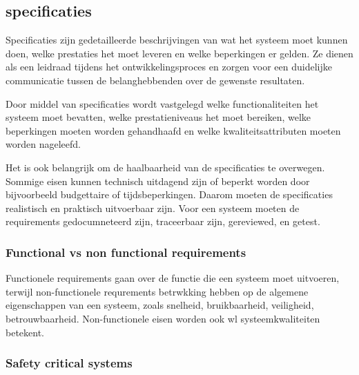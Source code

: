 \documentclass{article}
\begin{document}
	\subsection{specificaties}
	Specificaties zijn gedetailleerde beschrijvingen van wat het systeem moet kunnen doen, welke prestaties het moet leveren en welke beperkingen er gelden. Ze dienen als een leidraad tijdens het ontwikkelingsproces en zorgen voor een duidelijke communicatie tussen de belanghebbenden over de gewenste resultaten.
	
	Door middel van specificaties wordt vastgelegd welke functionaliteiten het systeem moet bevatten, welke prestatieniveaus het moet bereiken, welke beperkingen moeten worden gehandhaafd en welke kwaliteitsattributen moeten worden nageleefd.
	
	Het is ook belangrijk om de haalbaarheid van de specificaties te overwegen. Sommige eisen kunnen technisch uitdagend zijn of beperkt worden door bijvoorbeeld budgettaire of tijdsbeperkingen.
	Daarom moeten de specificaties realistisch en praktisch uitvoerbaar zijn.
	Voor een systeem moeten de requirements gedocumneteerd zijn, traceerbaar zijn, gereviewed, en getest.
	
%	
%	
%	
%	
	
	
	
	
	
	
	
	
	
	
	
	
	\subsubsection{Functional vs non functional requirements}
	Functionele requirements gaan over de functie die een systeem moet uitvoeren, terwijl non-functionele requrements betrwkking  hebben op de algemene eigenschappen van een systeem, zoals snelheid, bruikbaarheid, veiligheid, betrouwbaarheid. Non-functionele eisen worden ook wl systeemkwaliteiten betekent.
	\subsubsection{Safety critical systems}
	
\end{document}
